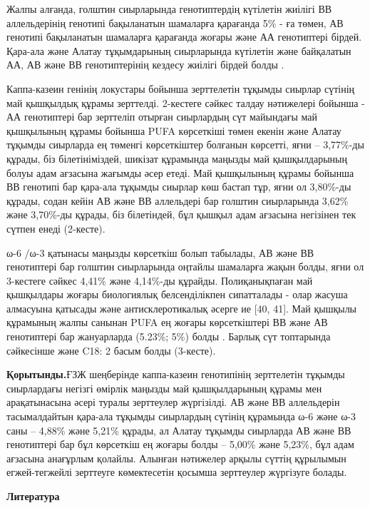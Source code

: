 \begin{multicols}{2}
Жалпы алғанда, голштин сиырларында генотиптердің күтілетін жиілігі ВВ
аллельдерінің генотипі бақыланатын шамаларға қарағанда 5\% - ға төмен,
АВ генотипі бақыланатын шамаларға қарағанда жоғары және АА генотиптері
бірдей. Қара-ала және Алатау тұқымдарының сиырларында күтілетін және
байқалатын АА, АВ және ВВ генотиптерінің кездесу жиілігі бірдей болды .

Каппа-казеин генінің локустары бойынша зерттелетін тұқымды сиырлар
сүтінің май қышқылдық құрамы зерттелді. 2-кестеге сәйкес талдау
нәтижелері бойынша - АА генотиптері бар зерттеліп отырған сиырлардың сүт
майындағы май қышқылының құрамы бойынша PUFA көрсеткіші төмен екенін
және Алатау тұқымды сиырларда ең төменгі көрсеткіштер болғанын көрсетті,
яғни -- 3,77\%-ды құрады, біз білетініміздей, шикізат құрамында маңызды
май қышқылдарының болуы адам ағзасына жағымды әсер етеді. Май қышқылының
құрамы бойынша ВВ генотипі бар қара-ала тұқымды сиырлар көш бастап тұр,
яғни ол 3,80\%-ды құрады, содан кейін АВ және ВВ аллельдері бар голштин
сиырларында 3,62\% және 3,70\%-ды құрады, біз білетіндей, бұл қышқыл
адам ағзасына негізінен тек сүтпен енеді (2-кесте).

ω-6 /ω-3 қатынасы маңызды көрсеткіш болып табылады, АВ және ВВ
генотиптері бар голштин сиырларында оңтайлы шамаларға жақын болды, яғни
ол 3-кестеге сәйкес 4,41\% және 4,14\%-ды құрайды. Полиқанықпаған май
қышқылдары жоғары биологиялық белсенділікпен сипатталады - олар жасуша
алмасуына қатысады және антисклеротикалық әсерге ие {[}40, 41{]}. Май
қышқылы құрамының жалпы санынан PUFA ең жоғары көрсеткіштері ВВ және АВ
генотиптері бар жануарларда (5.23\%; 5\%) болды . Барлық сүт топтарында
сәйкесінше және C18: 2 басым болды (3-кесте).

{\bfseries Қорытынды.}ҒЗЖ шеңберінде каппа-казеин генотипінің зерттелетін
тұқымды сиырлардағы негізгі өмірлік маңызды май қышқылдарының құрамы мен
арақатынасына әсері туралы зерттеулер жүргізілді. АВ және ВВ аллельдерін
тасымалдайтын қара-ала тұқымды сиырлардың сүтінің құрамында ω-6 және ω-3
саны -- 4,88\% және 5,21\% құрады, ал Алатау тұқымды сиырларда АВ және
ВВ генотиптері бар бұл көрсеткіш ең жоғары болды -- 5,00\% және 5,23\%,
бұл адам ағзасына анағұрлым қолайлы. Алынған нәтижелер арқылы сүттің
құрылымын егжей-тегжейлі зерттеуге көмектесетін қосымша зерттеулер
жүргізуге болады.
\end{multicols}


\begin{center}
  {\bfseries Литература}
  \end{center}

